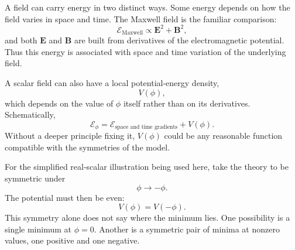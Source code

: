 \begin{classroomqa}
\end{classroomqa}

\begin{classroomqa}
\end{classroomqa}

A field can carry energy in two distinct ways. Some energy depends on how the field varies in space and time. The Maxwell field is the familiar comparison:
\begin{equation}
\mathcal{E}_{\mathrm{Maxwell}}\propto \mathbf E^2+\mathbf B^2,
\end{equation}
and both \(\mathbf E\) and \(\mathbf B\) are built from derivatives of the electromagnetic potential. Thus this energy is associated with space and time variation of the underlying field.

A scalar field can also have a local potential-energy density,
\begin{equation}
V(\phi),
\end{equation}
which depends on the value of \(\phi\) itself rather than on its derivatives. Schematically,
\begin{equation}
\mathcal{E}_\phi
=
\mathcal E_{\text{space and time gradients}}+V(\phi).
\end{equation}
Without a deeper principle fixing it, \(V(\phi)\) could be any reasonable function compatible with the symmetries of the model.

For the simplified real-scalar illustration being used here, take the theory to be symmetric under
\begin{equation}
\phi\longrightarrow-\phi.
\end{equation}
The potential must then be even:
\begin{equation}
V(\phi)=V(-\phi).
\end{equation}
This symmetry alone does not say where the minimum lies. One possibility is a single minimum at \(\phi=0\). Another is a symmetric pair of minima at nonzero values, one positive and one negative.


